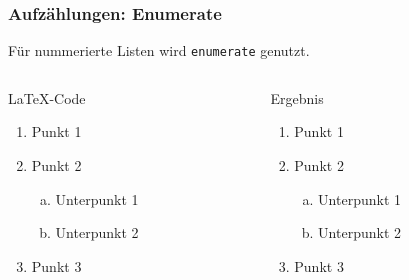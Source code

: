 \begin{frame}[fragile]
    \frametitle{Aufzählungen: Enumerate}
    Für nummerierte Listen wird \texttt{enumerate} genutzt.
    \begin{columns}[t]
        \begin{column}{0.47\textwidth}
            \begin{block}{\LaTeX-Code}
                \begin{lstverbatim}
                \begin{enumerate}
                    \item Punkt 1
                    \item Punkt 2
                        \begin{enumerate}[(a)]
                            \item Unterpunkt 1
                            \item Unterpunkt 2
                        \end{enumerate}
                    \item Punkt 3
                \end{enumerate}
                \end{lstverbatim}
            \end{block}
        \end{column}
        \begin{column}{0.47\textwidth}
            \begin{block}{Ergebnis}
                \begin{enumerate}
                    \item Punkt 1
                    \item Punkt 2
                        \begin{enumerate}[(a)]
                            \item Unterpunkt 1
                            \item Unterpunkt 2
                        \end{enumerate}
                    \item Punkt 3
                \end{enumerate}
            \end{block}
        \end{column}
    \end{columns}
\end{frame}
